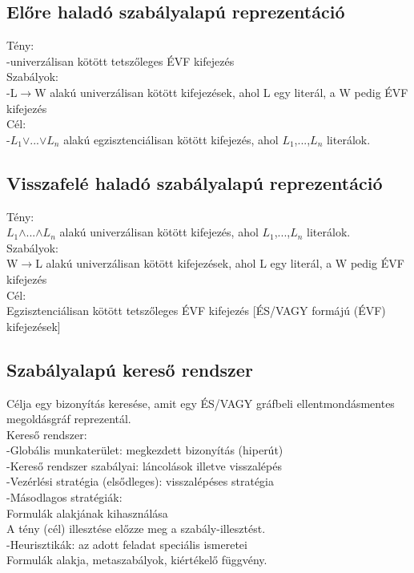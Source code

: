 \documentclass{article}
\begin{document}
	 \subsection{Előre haladó szabályalapú reprezentáció}
	 Tény:\\
	 -univerzálisan kötött tetszőleges ÉVF kifejezés\\
	 Szabályok:\\
	 -L$\rightarrow$W alakú univerzálisan kötött kifejezések, ahol L egy literál, a W pedig ÉVF kifejezés\\
	 Cél: \\
	 -$L_1$$\vee$...$\vee$$L_n$ alakú egzisztenciálisan kötött kifejezés, ahol $L_1$,...,$L_n$ literálok.\\
	 
	 \subsection{Visszafelé haladó szabályalapú reprezentáció}
	 Tény:\\
	 $L_1$$\wedge$...$\wedge$$L_n$ alakú univerzálisan kötött kifejezés, ahol $L_1$,...,$L_n$ literálok.\\
	 Szabályok:\\
	 W$\rightarrow$L alakú univerzálisan kötött kifejezések, ahol L egy literál, a W pedig ÉVF kifejezés\\
	 Cél:\\
	 Egzisztenciálisan kötött tetszőleges ÉVF kifejezés [ÉS/VAGY formájú (ÉVF) kifejezések]\\
	 
	 \subsection{Szabályalapú kereső rendszer}
	 Célja egy bizonyítás keresése, amit egy ÉS/VAGY gráfbeli ellentmondásmentes megoldásgráf reprezentál.\\
	 Kereső rendszer:\\
	 -Globális munkaterület: megkezdett bizonyítás (hiperút)\\
	 -Kereső rendszer szabályai: láncolások illetve visszalépés\\
	 -Vezérlési stratégia (elsődleges): visszalépéses stratégia\\
	 -Másodlagos stratégiák:\\
	 \hspace*{1em} Formulák alakjának kihasználása\\
	 \hspace*{1em} A tény (cél) illesztése előzze meg a szabály-illesztést.\\
	 -Heurisztikák: az adott feladat speciális ismeretei\\
	 \hspace*{1em} Formulák alakja, metaszabályok, kiértékelő függvény.
	 
\end{document}
